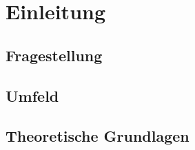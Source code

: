 \chapter{Einleitung}
\label{chap:einleitung}
\section{Fragestellung}
\label{sec:fragestellung}
\section{Umfeld}
\label{sec:umfeld}
\section{Theoretische Grundlagen}
\label{sec:grundlagen}
